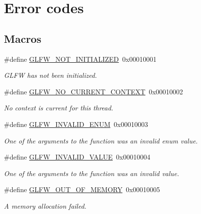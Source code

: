 \hypertarget{group__errors}{}\section{Error codes}
\label{group__errors}
\subsection*{Macros}
\begin{DoxyCompactItemize}
\item 
\#define \hyperlink{group__errors_ga2374ee02c177f12e1fa76ff3ed15e14a}{G\+L\+F\+W\+\_\+\+N\+O\+T\+\_\+\+I\+N\+I\+T\+I\+A\+L\+I\+Z\+ED}~0x00010001
\begin{DoxyCompactList}\small\item\em G\+L\+FW has not been initialized. \end{DoxyCompactList}\item 
\#define \hyperlink{group__errors_gaa8290386e9528ccb9e42a3a4e16fc0d0}{G\+L\+F\+W\+\_\+\+N\+O\+\_\+\+C\+U\+R\+R\+E\+N\+T\+\_\+\+C\+O\+N\+T\+E\+XT}~0x00010002
\begin{DoxyCompactList}\small\item\em No context is current for this thread. \end{DoxyCompactList}\item 
\#define \hyperlink{group__errors_ga76f6bb9c4eea73db675f096b404593ce}{G\+L\+F\+W\+\_\+\+I\+N\+V\+A\+L\+I\+D\+\_\+\+E\+N\+UM}~0x00010003
\begin{DoxyCompactList}\small\item\em One of the arguments to the function was an invalid enum value. \end{DoxyCompactList}\item 
\#define \hyperlink{group__errors_gaaf2ef9aa8202c2b82ac2d921e554c687}{G\+L\+F\+W\+\_\+\+I\+N\+V\+A\+L\+I\+D\+\_\+\+V\+A\+L\+UE}~0x00010004
\begin{DoxyCompactList}\small\item\em One of the arguments to the function was an invalid value. \end{DoxyCompactList}\item 
\#define \hyperlink{group__errors_ga9023953a2bcb98c2906afd071d21ee7f}{G\+L\+F\+W\+\_\+\+O\+U\+T\+\_\+\+O\+F\+\_\+\+M\+E\+M\+O\+RY}~0x00010005
\begin{DoxyCompactList}\small\item\em A memory allocation failed. \end{DoxyCompactList}\item 

\end{DoxyCompactItemize}
